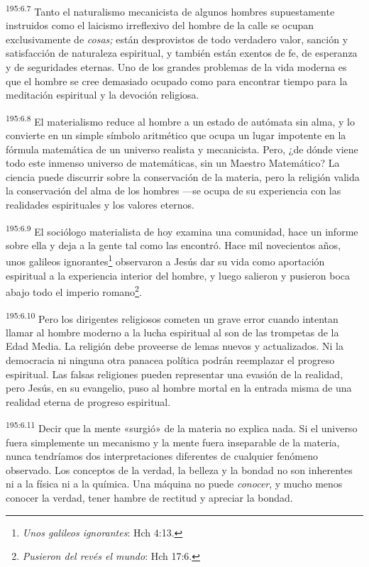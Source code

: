 \par 
\textsuperscript{195:6.7} Tanto el naturalismo mecanicista de algunos hombres supuestamente instruidos como el laicismo irreflexivo del hombre de la calle se ocupan exclusivamente de \textit{cosas;} están desprovistos de todo verdadero valor, sanción y satisfacción de naturaleza espiritual, y también están exentos de fe, de esperanza y de seguridades eternas. Uno de los grandes problemas de la vida moderna es que el hombre se cree demasiado ocupado como para encontrar tiempo para la meditación espiritual y la devoción religiosa.

\par 
\textsuperscript{195:6.8} El materialismo reduce al hombre a un estado de autómata sin alma, y lo convierte en un simple símbolo aritmético que ocupa un lugar impotente en la fórmula matemática de un universo realista y mecanicista. Pero, ¿de dónde viene todo este inmenso universo de matemáticas, sin un Maestro Matemático? La ciencia puede discurrir sobre la conservación de la materia, pero la religión valida la conservación del alma de los hombres ---se ocupa de su experiencia con las realidades espirituales y los valores eternos.

\par 
\textsuperscript{195:6.9} El sociólogo materialista de hoy examina una comunidad, hace un informe sobre ella y deja a la gente tal como las encontró. Hace mil novecientos años, unos galileos ignorantes\footnote{\textit{Unos galileos ignorantes}: Hch 4:13.} observaron a Jesús dar su vida como aportación espiritual a la experiencia interior del hombre, y luego salieron y pusieron boca abajo todo el imperio romano\footnote{\textit{Pusieron del revés el mundo}: Hch 17:6.}.

\par 
\textsuperscript{195:6.10} Pero los dirigentes religiosos cometen un grave error cuando intentan llamar al hombre moderno a la lucha espiritual al son de las trompetas de la Edad Media. La religión debe proveerse de lemas nuevos y actualizados. Ni la democracia ni ninguna otra panacea política podrán reemplazar el progreso espiritual. Las falsas religiones pueden representar una evasión de la realidad, pero Jesús, en su evangelio, puso al hombre mortal en la entrada misma de una realidad eterna de progreso espiritual.

\par 
\textsuperscript{195:6.11} Decir que la mente «surgió» de la materia no explica nada. Si el universo fuera simplemente un mecanismo y la mente fuera inseparable de la materia, nunca tendríamos dos interpretaciones diferentes de cualquier fenómeno observado. Los conceptos de la verdad, la belleza y la bondad no son inherentes ni a la física ni a la química. Una máquina no puede \textit{conocer}, y mucho menos conocer la verdad, tener hambre de rectitud y apreciar la bondad.

